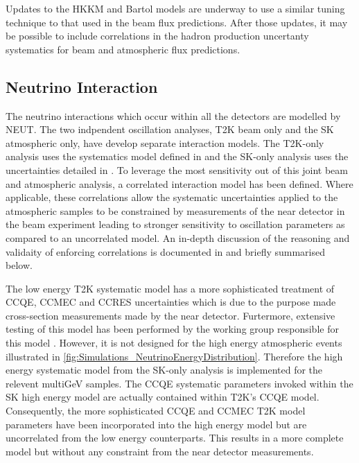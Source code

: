 Updates to the HKKM and Bartol models are underway to use a similar tuning technique to that used in the beam flux predictions. After those updates, it may be possible to include correlations in the hadron production uncertanty systematics for beam and atmospheric flux predictions.

\subsection{Neutrino Interaction}
\label{sec:SelsAndSysts_Systs_Interaction}

The neutrino interactions which occur within all the detectors are modelled by NEUT. The two indpendent oscillation analyses, T2K beam only and the SK atmospheric only, have develop separate interaction models. The T2K-only analysis uses the systematics model defined in \cite{t2k_tn_344} and the SK-only analysis uses the uncertainties detailed in \cite{Kamiokande_Collaboration2017-nf}. To leverage the most sensitivity out of this joint beam and atmospheric analysis, a correlated interaction model has been defined. Where applicable, these correlations allow the systematic uncertainties applied to the atmospheric samples to be constrained by measurements of the near detector in the beam experiment leading to stronger sensitivity to oscillation parameters as compared to an uncorrelated model. An in-depth discussion of the reasoning and validaity of enforcing correlations is documented in \cite{t2k_tn_422} and briefly summarised below.

The low energy T2K systematic model has a more sophisticated treatment of CCQE, CCMEC and CCRES uncertainties which is due to the purpose made cross-section measurements made by the near detector. Furtermore, extensive testing of this model has been performed by the working group responsible for this model \cite{t2k_tn_344}. However, it is not designed for the high energy atmospheric events illustrated in \autoref{fig:Simulations_NeutrinoEnergyDistribution}. Therefore the high energy systematic model from the SK-only analysis is implemented for the relevent multiGeV samples. The CCQE systematic parameters invoked within the SK high energy model are actually contained within T2K's CCQE model. Consequently, the more sophisticated CCQE and CCMEC T2K model parameters have been incorporated into the high energy model but are uncorrelated from the low energy counterparts. This results in a more complete model but without any constraint from the near detector measurements.

